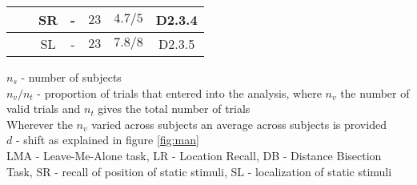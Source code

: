 \documentclass[10pt]{article}
\begin{document}
\begin{table}[!ht]
\begin{tabular}{|c|c|c|c|c|c|c|}
\hline
 & & SR & - & $23$ & $4.7/5$ & D2.3.4 \\
\hline
 & & SL & - & $23$ & $7.8/8$ & D2.3.5 \\
\hline
\end{tabular}
\begin{flushleft} $n_s$ - number of subjects\\ 
$n_v/n_t$ - proportion of trials that entered into the analysis, where $n_v$ the number of valid trials and $n_t$ gives the total number of trials
\\
Wherever the $n_v$ varied across subjects an average across subjects is provided \\
$d$ - shift as explained in figure \ref{fig:man}\\
LMA - Leave-Me-Alone task, LR - Location Recall, DB - Distance Bisection Task, SR - recall of position of static stimuli, SL - localization of static stimuli
\end{flushleft}
\label{tab:data}
\end{table}
\end{document}

